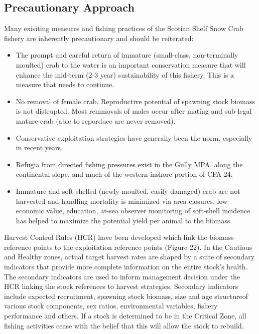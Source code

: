 \documentclass[paper=a4, fontsize=11pt]{article}
\begin{document}
\subsection{Precautionary Approach}
Many exisiting measures and fishing practices of the Scotian Shelf Snow Crab fishery are inherently precautionary and should be reiterated:
\begin{itemize}
  \item The prompt and careful return of immature (small-class, non-terminally moulted) crab to the water is an important conservation measure that will enhance the mid-term (2-3 year) sustainability of this fishery. This is a measure that needs to continue.
  \item No removal of female crab. Reproductive potential of spawning stock biomass is not distrupted. Most remmovals of males occur after mating and sub-legal mature crab (able to reporduce are never removed).
  \item Conservative exploitation strategies have generally been the norm, especially in recent years. 
  \item Refugia from directed fishing pressures exist in the Gully MPA, along the continental slope, and much of the western inshore portion of CFA 24.\
  \item Immature and soft-shelled (newly-moulted, easily damaged) crab are not harvested and handling mortality is minimized via area closures, low economic value, education, at-sea observer monitoring of soft-shell incidence has helped to maximize the potential yield per animal to the biomass. \\
 \end{itemize} 

Harvest Control Rules (HCR) have been developed which link the biomass reference points to the exploitation reference points (Figure 22). In the Cautious and Healthy zones, actual target harvest rates are shaped by a suite of secondary indicators that provide more complete information on the entire stock's health. The secondary indicators are used to inform management decision under the HCR linking the stock references to harvest strategies. Secondary indicators include expected recruitment, spawning stock biomass, size and age structureof various stock components, sex ratios, environmental variables, fishery performance and others. If a stock is determined to be in the Critical Zone, all fishing activities cease with the belief that this will allow the stock to rebuild. \\
\end{document}
